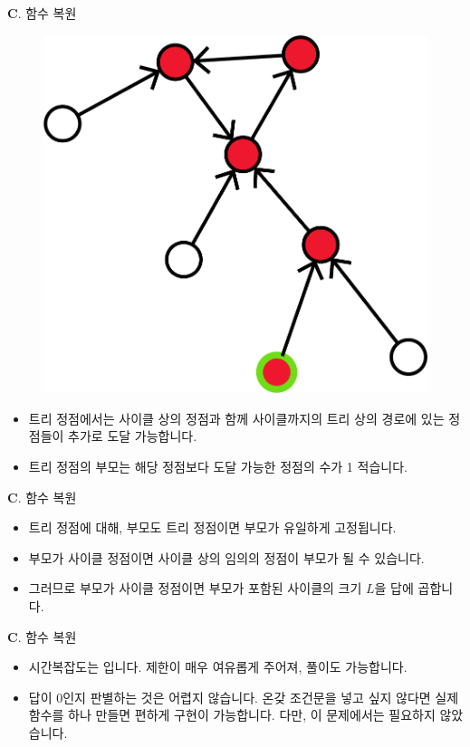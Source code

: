 \begin{frame}{\textbf{C}. 함수 복원}
    \begin{figure}[h!]
        \centering
        \includegraphics[width=0.35\linewidth]{../images/function-restore/fx-3n.png}
    \end{figure}
    \begin{itemize}
        \item 트리 정점에서는 사이클 상의 정점과 함께 사이클까지의 트리 상의 경로에 있는 정점들이 추가로 도달 가능합니다.
        \item 트리 정점의 부모는 해당 정점보다 도달 가능한 정점의 수가 1 적습니다.
    \end{itemize}
\end{frame}
\begin{frame}{\textbf{C}. 함수 복원}
    \begin{itemize}
        \item 트리 정점에 대해, 부모도 트리 정점이면 부모가 유일하게 고정됩니다.
        \item 부모가 사이클 정점이면 사이클 상의 임의의 정점이 부모가 될 수 있습니다.
        \item 그러므로 부모가 사이클 정점이면 부모가 포함된 사이클의 크기 $L$을 답에 곱합니다.
    \end{itemize}
\end{frame}
\begin{frame}{\textbf{C}. 함수 복원}
    \begin{itemize}
        \item 시간복잡도는 입니다. 제한이 매우 여유롭게 주어져,  풀이도 가능합니다.
        \item 답이 0인지 판별하는 것은 어렵지 않습니다. 온갖 조건문을 넣고 싶지 않다면 실제 함수를 하나 만들면 편하게 구현이 가능합니다. 다만, 이 문제에서는 필요하지 않았습니다.
    \end{itemize}
\end{frame}
